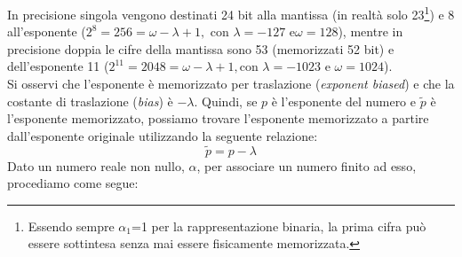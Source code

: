 \documentclass{article}
\begin{document}
\newpage
In precisione singola vengono destinati 24 bit alla mantissa (in realtà solo
23\footnote{Essendo sempre $\alpha_1$=1 per la rappresentazione binaria, la
prima cifra può essere sottintesa senza mai essere fisicamente memorizzata.}) e
8 all'esponente ($2^8=256=\omega-\lambda+1,\text{ con }\lambda=-127\text{ e
}\omega=128$), mentre in precisione doppia le cifre della mantissa sono 53
(memorizzati 52 bit) e dell'esponente 11 ($2^{11}=2048=\omega-\lambda+1,\text{
con }\lambda=-1023\text{ e }\omega=1024$).\\ 
Si osservi che l'esponente è memorizzato per traslazione (\textit{exponent
biased}) e che la costante di traslazione (\textit{bias}) è $-\lambda$. Quindi,
se $p$ è l'esponente del numero e $\tilde{p}$ è l'esponente memorizzato,
possiamo trovare l'esponente memorizzato a partire dall'esponente originale
utilizzando la seguente relazione:
$$\tilde{p}=p-\lambda$$
Dato un numero reale non nullo, $\alpha$, per associare un numero finito ad
esso, procediamo come segue:
\end{document}
